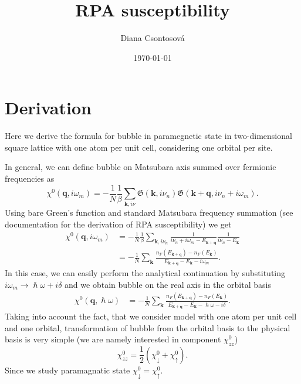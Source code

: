 \documentclass[preprint,prb,amsmath,superscriptaddress,showpacs]{revtex4}
\newcommand{\bk}{\mathbf{k}}
\newcommand{\bq}{\mathbf{q}}
\begin{document}
\title{RPA susceptibility}

\author{Diana Csontosová}

\date{\today}


\section{Derivation}

Here we derive the formula for bubble in paramegnetic state in
two-dimensional square lattice with one atom per unit cell,
considering one orbital per site.

In general, we can define bubble on Matsubara axis summed over
fermionic frequencies as
%
\begin{equation}
      \chi^0(\bq, i \omega_m) =
      - \frac{1}{N} \frac{1}{\beta} \sum_{\bk, i\nu} 
      \mathfrak{G}(\bk, i\nu_n)
      \mathfrak{G}(\bk + \bq, i\nu_{n} + i\omega_m).
\end{equation}
%
Using bare Green's function and standard Matsubara frequency summation
(see documentation for the derivation of RPA susceptibility) we get
%
\begin{equation}
  \begin{aligned}
  \chi^0(\bq, i \omega_m) &= - \frac{1}{N} \frac{1}{\beta} \sum_{\bk, i\nu_n} \frac{1}{i\nu_n +
    i\omega_m - E_{\bk + \bq}} \frac{1}{i\nu_n - E_{\bk}} \\
  &= - \frac{1}{N} \sum_{\bk} \frac{n_F (E_{\bk + \bq}) - n_F
    (E_{\bk})}{E_{\bk + \bq} - E_{\bk} - i\omega_m}.
  \end{aligned}
\end{equation}
In this case, we can easily perform the analytical continuation by
substituting $i\omega_m \rightarrow \hslash\omega + i\delta$ and we obtain
bubble on the real axis in the orbital basis
%
\begin{equation}
  \begin{aligned}
  \chi^0(\bq, \hslash \omega) &= - \frac{1}{N} \sum_{\bk} \frac{n_F (E_{\bk + \bq}) - n_F
    (E_{\bk})}{E_{\bk + \bq} - E_{\bk} - \hslash \omega - i\delta}.
  \end{aligned}
\end{equation}
%
Taking into account the fact, that we consider model with one atom per
unit cell and one orbital, transformation of bubble from the orbital basis to the physical
basis is very
simple (we are namely interested in component $\chi^0_{zz}$)
%
\begin{equation}
  \chi^0_{zz} = \frac{1}{2} \left(\chi^0_{\downarrow} +
    \chi^0_{\uparrow} \right).
\end{equation}
%
Since we study paramagnatic state $\chi^0_{\downarrow} = \chi^0_{\uparrow}$.
%
\end{document}
